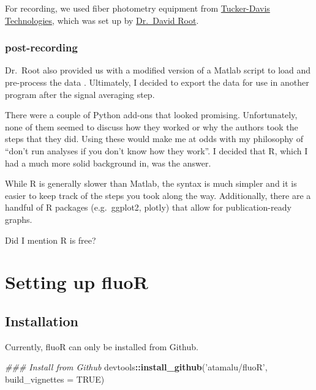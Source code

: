 \documentclass[
]{book}
\newenvironment{Shaded}{\begin{snugshade}}{\end{snugshade}}
\newcommand{\CommentTok}[1]{\textcolor[rgb]{0.56,0.35,0.01}{\textit{#1}}}
\newcommand{\DataTypeTok}[1]{\textcolor[rgb]{0.13,0.29,0.53}{#1}}
\newcommand{\KeywordTok}[1]{\textcolor[rgb]{0.13,0.29,0.53}{\textbf{#1}}}
\newcommand{\NormalTok}[1]{#1}
\newcommand{\OperatorTok}[1]{\textcolor[rgb]{0.81,0.36,0.00}{\textbf{#1}}}
\newcommand{\OtherTok}[1]{\textcolor[rgb]{0.56,0.35,0.01}{#1}}
\newcommand{\StringTok}[1]{\textcolor[rgb]{0.31,0.60,0.02}{#1}}
\begin{document}
For recording, we used fiber photometry equipment from \href{https://www.tdt.com/}{Tucker-Davis Technologies}, which was set up by \href{https://www.colorado.edu/neuroscience/david-root}{Dr.~David Root}.

\hypertarget{index-postrecording}{%
\subsection{post-recording}\label{index-postrecording}}

Dr.~Root also provided us with a modified version of a Matlab script to load and pre-process the data \citep{root_fiber_2018}. Ultimately, I decided to export the data for use in another program after the signal averaging step.

There were a couple of Python add-ons that looked promising. Unfortunately, none of them seemed to discuss how they worked or why the authors took the steps that they did. Using these would make me at odds with my philosophy of ``don't run analyses if you don't know how they work''. I decided that R, which I had a much more solid background in, was the answer.

While R is generally slower than Matlab, the syntax is much simpler and it is easier to keep track of the steps you took along the way. Additionally, there are a handful of R packages (e.g.~ggplot2, plotly) that allow for publication-ready graphs.

Did I mention R is free?

\hypertarget{intro}{%
\chapter{Setting up fluoR}\label{intro}}

\hypertarget{intro-install}{%
\section{Installation}\label{intro-install}}

Currently, fluoR can only be installed from Github.

\begin{Shaded}
\begin{Highlighting}[]
\CommentTok{### Install from Github}
\NormalTok{devtools}\OperatorTok{::}\KeywordTok{install_github}\NormalTok{(}\StringTok{'atamalu/fluoR'}\NormalTok{, }\DataTypeTok{build_vignettes =} \OtherTok{TRUE}\NormalTok{)}
\end{Highlighting}
\end{Shaded}
\end{document}
